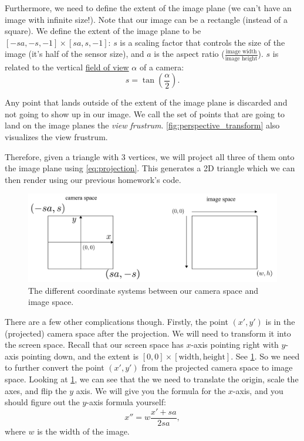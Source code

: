 Furthermore, we need to define the extent of the image plane (we can't have an image with infinite size!). Note that our image can be a rectangle (instead of a square). We define the extent of the image plane to be $[-sa, -s, -1] \times [sa, s, -1]$: $s$ is a scaling factor that controls the size of the image (it's half of the sensor size), and $a$ is the aspect ratio ($\frac{\text{image width}}{\text{image height}}$). $s$ is related to the vertical \href{https://en.wikipedia.org/wiki/Field_of_view}{field of view} $\alpha$ of a camera:
\begin{equation}
s = \tan\left(\frac{\alpha}{2}\right).
\end{equation}

Any point that lands outside of the extent of the image plane is discarded and not going to show up in our image. We call the set of points that are going to land on the image planes the \emph{view frustrum}. \cref{fig:perspective_transform} also visualizes the view frustrum.

Therefore, given a triangle with 3 vertices, we will project all three of them onto the image plane using \cref{eq:projection}. This generates a 2D triangle which we can then render using our previous homework's code.

\begin{figure}[h]
    \centering
    \includegraphics[width=0.9\linewidth]{imgs/camera_vs_image.pdf}
    \caption{The different coordinate systems between our camera space and image space.}
    \label{fig:camera_vs_image}
\end{figure}

There are a few other complications though. Firstly, the point $(x', y')$ is in the (projected) camera space after the projection. We will need to transform it into the screen space. Recall that our screen space has $x$-axis pointing right with $y$-axis pointing down, and the extent is $[0, 0] \times [\text{width}, \text{height}]$. See \cref{fig:camera_vs_image}. So we need to further convert the point $(x', y')$ from the projected camera space to image space. Looking at \cref{fig:camera_vs_image}, we can see that the we need to translate the origin, scale the axes, and flip the $y$ axis. We will give you the formula for the $x$-axis, and you should figure out the $y$-axis formula yourself:
\begin{equation}
x'' = w\frac{x'+sa}{2sa},
\label{eq:camera_to_screen}
\end{equation}
where $w$ is the width of the image.

